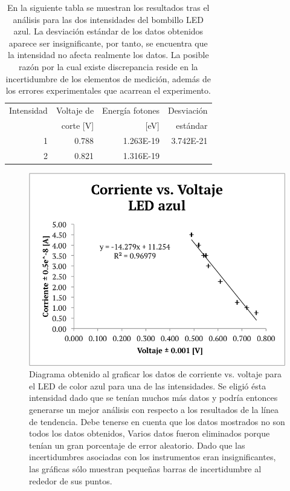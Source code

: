 \documentclass[%
 reprint,
 amsmath,amssymb,
 aps,
]{revtex4-1}
\begin{document}
\begin{table}[H]
  \centering
  \caption{En la siguiente tabla se muestran los resultados tras el análisis para las dos intensidades del bombillo LED azul. La desviación estándar de los datos obtenidos aparece ser insignificante, por tanto, se encuentra que la intensidad no afecta realmente los datos. La posible razón por la cual existe discrepancia reside en la incertidumbre de los elementos de medición, además de los errores experimentales que acarrean el experimento.}
    \begin{tabular}{|r|r|r|r|}
    \hline
    {Intensidad} & {Voltaje de} & {Energía fotones} & {Desviación} \\
          & {corte [V]} & {[eV]} & {estándar} \\
    \hline
    1     & 0.788 & 1.263E-19 & 3.742E-21 \\
    2     & 0.821 & 1.316E-19 &  \\
    \hline
    \end{tabular}
  \label{tab:intesidades azul}
\end{table}

\begin{figure}[H]
    \centering
    \includegraphics[scale= 0.6]{Azul_mejorado.png}
    \caption{Diagrama obtenido al graficar los datos de corriente vs. voltaje para el LED de color azul para una de las intensidades. Se eligió ésta intensidad dado que se tenían muchos más datos y podría entonces generarse un mejor análisis con respecto a los resultados de la línea de tendencia. Debe tenerse en cuenta que los datos mostrados no son todos los datos obtenidos, Varios datos fueron eliminados porque tenían un gran porcentaje de error aleatorio. Dado que las incertidumbres asociadas con los instrumentos eran insignificantes, las gráficas sólo muestran pequeñas barras de incertidumbre al rededor de sus puntos.}
    \label{fig:azul}
\end{figure}
\end{document}
